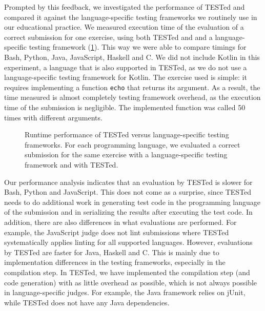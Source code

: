 \documentclass[../main]{subfiles}
\begin{document}
Prompted by this feedback, we investigated the performance of TESTed and compared it against the language-specific testing frameworks we routinely use in our educational practice.
We measured execution time of the evaluation of a correct submission for one exercise, using both TESTed and and a language-specific testing framework (\cref{fig:performance}).
This way we were able to compare timings for Bash, Python, Java, JavaScript, Haskell and C\@.
We did not include Kotlin in this experiment, a language that is also supported in TESTed, as we do not use a language-specific testing framework for Kotlin.
The exercise used is simple: it requires implementing a function \texttt{echo} that returns its argument.
As a result, the time measured is almost completely testing framework overhead, as the execution time of the submission is negligible.
The implemented function was called 50 times with different arguments.

\begin{figure}[t]
    \centering
    
    \caption{Runtime performance of TESTed versus language-specific testing frameworks. For each programming language, we evaluated a correct submission for the same exercise with a language-specific testing framework and with TESTed.}
    \label{fig:performance}
\end{figure}

Our performance analysis indicates that an evaluation by TESTed is slower for Bash, Python and JavaScript.
This does not come as a surprise, since TESTed needs to do additional work in generating test code in the programming language of the submission and in serializing the results after executing the test code.
In addition, there are also differences in what evaluations are performed.
For example, the JavaScript judge does not lint submissions where TESTed systematically applies linting for all supported languages.
However, evaluations by TESTed are faster for Java, Haskell and C\@.
This is mainly due to implementation differences in the testing frameworks, especially in the compilation step.
In TESTed, we have implemented the compilation step (and code generation) with as little overhead as possible, which is not always possible in language-specific judges.
For example, the Java framework relies on jUnit, while TESTed does not have any Java dependencies.
\end{document}
